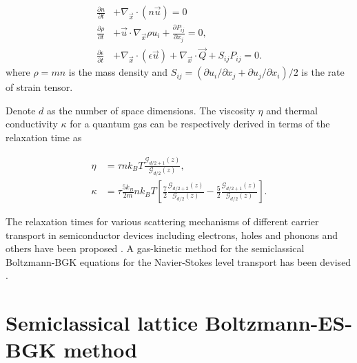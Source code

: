 \documentclass[doublecol]{epl2}
\begin{document}
\begin{align}
\frac{\partial n}{\partial t} &+ \nabla_{\vec x} \cdot (n \vec u) = 0 \\
\frac{\partial \rho}{\partial t} &+ \vec u \cdot \nabla_{\vec x} \rho u_{i} + \frac{\partial P_{ij}}{\partial x_{j} } = 0, \\
\frac{\partial \epsilon}{\partial t} &+ \nabla_{\vec x} \cdot (\epsilon \vec u) + \nabla_{\vec x} \cdot \vec Q + S_{ij} P_{ij} = 0.
\end{align}
where $\rho=m n$ is the mass density and $S_{ij}=(\partial u_{i}/\partial x_{j} + \partial u_{j}/\partial x_{i})/2$ is the rate of strain tensor.

Denote $d$ as the number of space dimensions. The viscosity $\eta$ and thermal conductivity $\kappa$ for a quantum gas can be respectively derived in terms of the relaxation time as

\begin{align}
\eta &= \tau n  k_B T \frac{\mathcal{G}_{d/2+1}(z)}{\mathcal{G}_{d/2}(z) }, \\
\kappa &= \tau \frac{5 k_B}{2m} n k_B T [\frac{7}{2} \frac{\mathcal{G}_{d/2+2}(z)}{\mathcal{G}_{d/2}(z) } -\frac{5}{2}\frac{\mathcal{G}_{d/2+1}(z)}{\mathcal{G}_{d/2}(z)}].
\end{align}

The relaxation times for various scattering mechanisms of different carrier transport in semiconductor devices including electrons, holes and phonons and others have been proposed \cite{Lund2000, Chen2005}. A gas-kinetic method for the semiclassical Boltzmann-BGK equations for the Navier-Stokes level transport has been devised \cite{Shi2008}.

\section{Semiclassical lattice Boltzmann-ES-BGK method}
\end{document}
